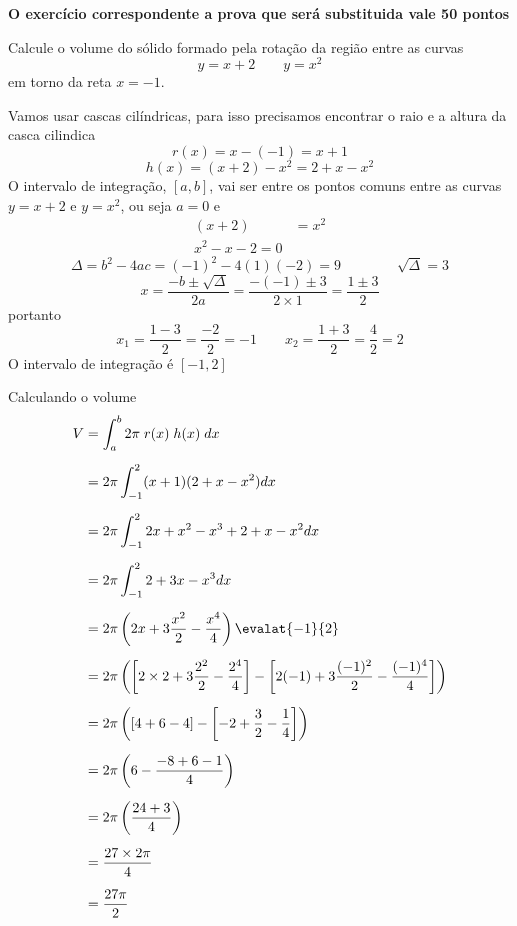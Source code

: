 \documentclass[a4paper,12pt,fleqn]{article}
\begin{document}

\textbf{O exercício correspondente a prova que será substituida vale 50 pontos}

Calcule o volume do sólido formado pela rotação da região entre as curvas
\[
y = x+2 \qquad
y = x^2
\]
em torno da reta \(x=-1\).

\begin{answer}
  Vamos usar cascas cilíndricas, para isso precisamos encontrar o raio e a
  altura da casca cilindica
  \[
    r(x) = x - (-1) = x + 1
  \]
  \[
    h(x) = (x + 2) - x^2 = 2 + x - x^2
  \]
  O intervalo de integração, \([a, b]\), vai ser entre os pontos
  comuns entre as curvas \(y=x+2\) e \(y=x^2\),
  ou seja \(a=0\) e
  \begin{align*}
    (x + 2) & = x^2 \\
    x^2 - x - 2 = 0
  \end{align*}
  \[
    \Delta
    = b^2-4ac
    = (-1)^2 - 4(1)(-2)
    = 9
    \qquad\qquad
    \sqrt{\Delta} = 3
  \]
  \[
    x
    = \frac{-b\pm\sqrt{\Delta}}{2a}
    = \frac{-(-1)\pm 3}{2\times 1}
    = \frac{1\pm 3}{2}
  \]
  portanto
  \[
    x_1 = \frac{1-3}{2} = \frac{-2}{2} = -1
    \qquad
    x_2 = \frac{1+3}{2} = \frac{4}{2} = 2
  \]
  O intervalo de integração é \([-1, 2]\)

  \vspace{\baselineskip}
  Calculando o volume
    \begin{align*}
      V
      & = \int_a^b 2\pi \;r(x) \;h(x)\; dx  \\[2mm]
      & = 2\pi \int_{-1}^2 (x + 1) (2 + x - x^2) dx  \\[2mm]
      & = 2\pi \int_{-1}^2 2x + x^2 - x^3 + 2 + x - x^2  dx \\[2mm]
      & = 2\pi \int_{-1}^2 2 + 3x -x^3 dx \\[2mm]
      & = 2\pi \left(2x + 3\frac{x^2}{2} - \frac{x^4}{4}\right) \evalat{-1}{2} \\[2mm]
      & = 2\pi \left(
                 \left[2\times 2 + 3\frac{2^2}{2} - \frac{2^4}{4}\right] -
                 \left[2(-1) + 3\frac{(-1)^2}{2} - \frac{(-1)^4}{4}\right]
               \right) \\[2mm]
      & = 2\pi \left(
                 \left[4 + 6 - 4\right] -
                 \left[-2 + \frac{3}{2} - \frac{1}{4}\right]
               \right) \\[2mm]
      & = 2\pi \left( 6 - \frac{-8 + 6 - 1}{4} \right) \\[2mm]
      & = 2\pi \left( \frac{24+3}{4} \right) \\[2mm]
      & = \frac{27\times 2\pi}{4} \\[2mm]
      & = \frac{27\pi}{2}
    \end{align*}
  \clearpage
\end{answer}
\end{document}
